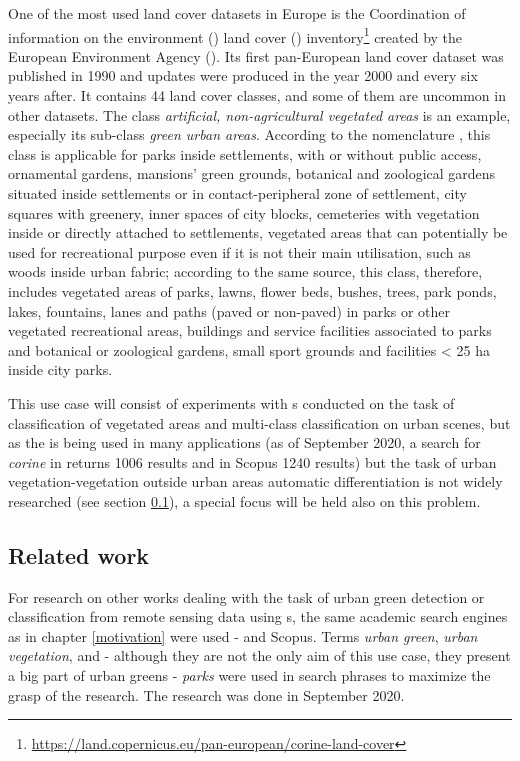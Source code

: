 One of the most used land cover datasets in Europe is the Coordination of information on the environment () land cover () inventory\footnote{\url{https://land.copernicus.eu/pan-european/corine-land-cover}} created by the European Environment Agency (). Its first pan-European land cover dataset was published in 1990 and updates were produced in the year 2000 and every six years after. It contains 44 land cover classes, and some of them are uncommon in other datasets. The class \textit{artificial, non-agricultural vegetated areas} is an example, especially its sub-class \textit{green urban areas}. According to the  nomenclature \cite{clc-nomenclature}, this class is applicable for parks inside settlements, with or without public access, ornamental gardens, mansions’ green grounds, botanical and zoological gardens situated inside settlements or in contact-peripheral zone of settlement, city squares with greenery, inner spaces of city blocks, cemeteries with vegetation inside or directly attached to settlements, vegetated areas that can potentially be used for recreational purpose even if it is not their main utilisation, such as woods inside urban fabric; according to the same source, this class, therefore, includes vegetated areas of parks, lawns, flower beds, bushes, trees, park ponds, lakes, fountains, lanes and paths (paved or non-paved) in parks or other vegetated recreational areas, buildings and service facilities associated to parks and botanical or zoological gardens, small sport grounds and facilities < 25 ha inside city parks.

This use case will consist of experiments with s conducted on the task of classification of vegetated areas and multi-class classification on urban scenes, but as the  is being used in many applications (as of September 2020, a search for \textit{corine} in  returns 1006 results and in Scopus 1240 results) but the task of urban vegetation-vegetation outside urban areas automatic differentiation is not widely researched (see section \ref{urban-green-situation}), a special focus will be held also on this problem.

\subsection{Related work}
\label{urban-green-situation}

For research on other works dealing with the task of urban green detection or classification from remote sensing data using s, the same academic search engines as in chapter \ref{motivation} were used -  and Scopus. Terms \textit{urban green}, \textit{urban vegetation}, and - although they are not the only aim of this use case, they present a big part of urban greens - \textit{parks} were used in search phrases to maximize the grasp of the research. The research was done in September 2020.

